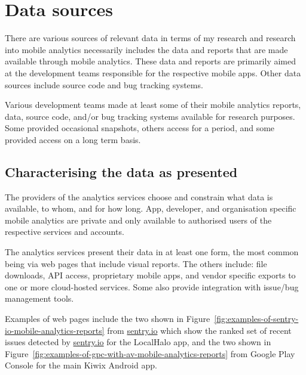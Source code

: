 \chapter{Data sources}
\label{app:data-sources}

There are various sources of relevant data in terms of my research and research into mobile analytics necessarily includes the data and reports that are made available through mobile analytics. These data and reports are primarily aimed at the development teams responsible for the respective mobile apps. Other data sources include source code and bug tracking systems. 

Various development teams made at least some of their mobile analytics reports, data, source code, and/or bug tracking systems available for research purposes. Some provided occasional snapshots, others access for a period, and some provided access on a long term basis.

\section{Characterising the data as presented}
The providers of the analytics services choose and constrain what data is available, to whom, and for how long. App, developer, and organisation specific mobile analytics are private and only available to authorised users of the respective services and accounts.

The analytics services present their data in at least one form, the most common being via web pages that include visual reports. The others include: file downloads, API access, proprietary mobile apps, and vendor specific exports to one or more cloud-hosted services. Some also provide integration with issue/bug management tools.

Examples of web pages include the two shown in Figure~\ref{fig:examples-of-sentry-io-mobile-analytics-reports} from \href{https://sentry.io/}{sentry.io} which show the ranked set of recent issues detected by \href{https://sentry.io/}{sentry.io} for the LocalHalo app, and the two shown in Figure~\ref{fig:examples-of-gpc-with-av-mobile-analytics-reports} from Google Play Console for the main Kiwix Android app. 

